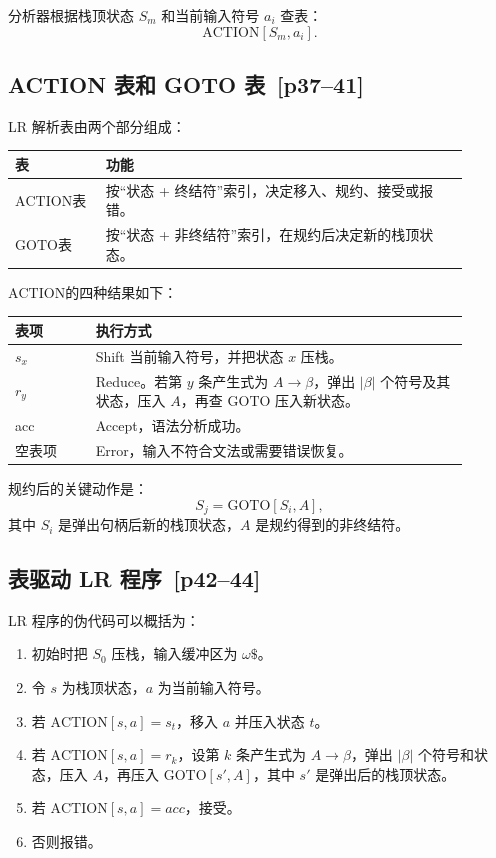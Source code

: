 \documentclass[UTF8,fontset=none,11pt]{ctexart}
\newcommand{\pg}[1]{\texorpdfstring{{\small\color{graytext}\,[p#1]}}{ [p#1]}}
\newcommand{\ACTION}{\ensuremath{\mathrm{ACTION}}}
\newcommand{\GOTO}{\ensuremath{\mathrm{GOTO}}}
\begin{document}
分析器根据栈顶状态 \(S_m\) 和当前输入符号 \(a_i\) 查表：
\[
\ACTION[S_m,a_i].
\]

\subsection{ACTION 表和 GOTO 表 \pg{37--41}}

LR 解析表由两个部分组成：

\begin{longtable}{L{0.18\linewidth}L{0.72\linewidth}}
\toprule
表 & 功能 \\
\midrule
\ACTION 表 & 按“状态 + 终结符”索引，决定移入、规约、接受或报错。\\
\GOTO 表 & 按“状态 + 非终结符”索引，在规约后决定新的栈顶状态。\\
\bottomrule
\end{longtable}

\ACTION 的四种结果如下：

\begin{longtable}{L{0.16\linewidth}L{0.74\linewidth}}
\toprule
表项 & 执行方式 \\
\midrule
\(s_x\) & Shift 当前输入符号，并把状态 \(x\) 压栈。\\
\(r_y\) & Reduce。若第 \(y\) 条产生式为 \(A\to\beta\)，弹出 \(|\beta|\) 个符号及其状态，压入 \(A\)，再查 \(\GOTO\) 压入新状态。\\
acc & Accept，语法分析成功。\\
空表项 & Error，输入不符合文法或需要错误恢复。\\
\bottomrule
\end{longtable}

规约后的关键动作是：
\[
S_j=\GOTO[S_i,A],
\]
其中 \(S_i\) 是弹出句柄后新的栈顶状态，\(A\) 是规约得到的非终结符。

\subsection{表驱动 LR 程序 \pg{42--44}}

LR 程序的伪代码可以概括为：

\begin{enumerate}
  \item 初始时把 \(S_0\) 压栈，输入缓冲区为 \(\omega\$\)。
  \item 令 \(s\) 为栈顶状态，\(a\) 为当前输入符号。
  \item 若 \(\ACTION[s,a]=s_t\)，移入 \(a\) 并压入状态 \(t\)。
  \item 若 \(\ACTION[s,a]=r_k\)，设第 \(k\) 条产生式为 \(A\to\beta\)，弹出 \(|\beta|\) 个符号和状态，压入 \(A\)，再压入 \(\GOTO[s',A]\)，其中 \(s'\) 是弹出后的栈顶状态。
  \item 若 \(\ACTION[s,a]=acc\)，接受。
  \item 否则报错。
\end{enumerate}
\end{document}
